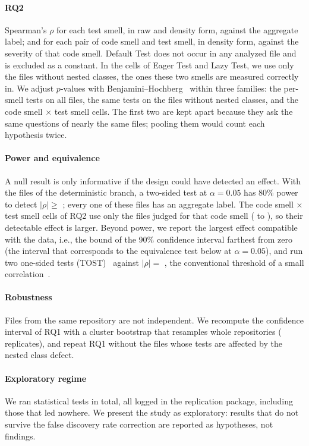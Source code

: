 \paragraph{RQ2}
Spearman's $\rho$ for each test smell, in raw and density form, against the aggregate
label; and for each pair of code smell and test smell, in density form, against the
severity of that code smell. Default Test does not occur in any analyzed file and is
excluded as a constant. In the cells of Eager Test and Lazy Test, we use only the files
without nested classes, the ones these two smells are measured correctly in. We adjust $p$-values with
Benjamini--Hochberg~\cite{benjamini1995fdr} within three families: the per-smell tests on
all files, the same tests on the files without nested classes, and the code smell $\times$
test smell cells. The first two are kept apart because they ask the same questions of
nearly the same files; pooling them would count each hypothesis twice.

\paragraph{Power and equivalence}
A null result is only informative if the design could have detected an effect. With the
\FarquivosDet{} files of the deterministic branch, a two-sided test at $\alpha = 0.05$ has 80\% power to detect
$|\rho| \geq$ \FrDetectavelDet{}; every one of these files has an aggregate label. The code
smell $\times$ test smell cells of RQ2 use only the files judged for that code smell
(\FnCelulaMinDet{} to \FnCelulaMaxDet{}), so their detectable effect is larger. Beyond
power, we report the largest effect compatible with the data, i.e., the bound of the 90\%
confidence interval farthest from zero (the interval that corresponds to the equivalence
test below at $\alpha = 0.05$), and run two one-sided tests (TOST)~\cite{lakens2017equivalence} against
$|\rho| = $ \FmargemEquivalencia{}, the conventional threshold of a small
correlation~\cite{cohen1988power}.

\paragraph{Robustness}
Files from the same repository are not independent. We recompute the confidence interval
of RQ1 with a cluster bootstrap that resamples whole repositories (\FreplicasBootstrap{}
replicates), and repeat RQ1 without the files whose tests are affected by the nested class
defect.

\paragraph{Exploratory regime}
We ran \FtestesTotal{} statistical tests in total, all logged in the replication package,
including those that led nowhere. We present the study as exploratory: results that do not
survive the false discovery rate correction are reported as hypotheses, not findings.

